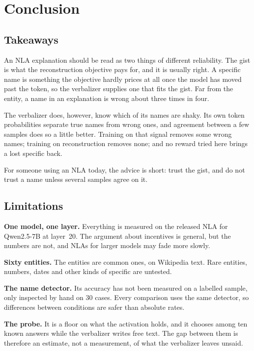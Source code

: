\chapter{Conclusion}
\label{ch:conclusion}

\section{Takeaways}

An NLA explanation should be read as two things of different reliability. The gist is what the
reconstruction objective pays for, and it is usually right. A specific name is something the objective
hardly prices at all once the model has moved past the token, so the verbalizer supplies one that fits the
gist. Far from the entity, a name in an explanation is wrong about three times in four.

The verbalizer does, however, know which of its names are shaky. Its own token probabilities separate true
names from wrong ones, and agreement between a few samples does so a little better. Training on that signal
removes some wrong names; training on reconstruction removes none; and no reward tried here brings a lost
specific back.

For someone using an NLA today, the advice is short: trust the gist, and do not trust a name unless several
samples agree on it.

\section{Limitations}
\label{ch:limitations}

\textbf{One model, one layer.} Everything is measured on the released NLA for Qwen2.5-7B at layer~20. The
argument about incentives is general, but the numbers are not, and NLAs for larger models may fade more
slowly.

\textbf{Sixty entities.} The entities are common ones, on Wikipedia text. Rare entities, numbers, dates and
other kinds of specific are untested.

\textbf{The name detector.} Its accuracy has not been measured on a labelled sample, only inspected by hand
on 30 cases. Every comparison uses the same detector, so differences between conditions are safer than
absolute rates.

\textbf{The probe.} It is a floor on what the activation holds, and it chooses among ten known answers while
the verbalizer writes free text. The gap between them is therefore an estimate, not a measurement, of what
the verbalizer leaves unsaid.

